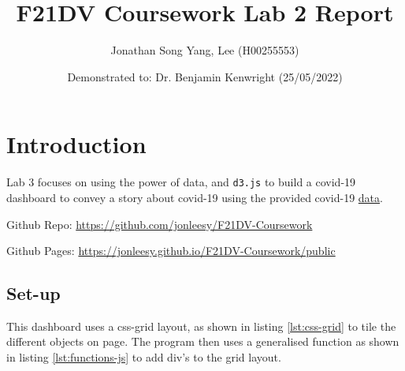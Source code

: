 \documentclass{scrreprt}
\title{F21DV Coursework Lab 2 Report}
\author{Jonathan Song Yang, Lee (H00255553)}
\date{Demonstrated to: Dr. Benjamin Kenwright (25/05/2022)}
\begin{document}


\maketitle

\newpage
\tableofcontents



\newpage
\chapter{Introduction}
Lab 3 focuses on using the power of data, and \verb|d3.js| to build a covid-19 dashboard to convey a story about covid-19 using the provided covid-19 \href{https://raw.githubusercontent.com/owid/covid-19-data/master/public/data/owid-covid-data.csv}{data}.
\par Github Repo: \href{https://github.com/jonleesy/F21DV-Coursework}{https://github.com/jonleesy/F21DV-Coursework}
\par Github Pages: \href{https://jonleesy.github.io/F21DV-Coursework/public}{https://jonleesy.github.io/F21DV-Coursework/public}

\section{Set-up}
This dashboard uses a css-grid layout, as shown in listing \ref{lst:css-grid} to tile the different objects on page. The program then uses a generalised function as shown in listing \ref{lst:functions-js} to add div's to the grid layout.
\vspace{8pt}


\end{document}
